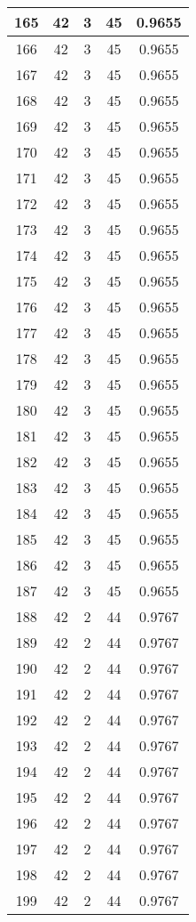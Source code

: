 \documentclass[letterpaper, 12pt]{article}
\begin{document}
\begin{longtable}{|c|c|c|c|c|}
\hline
165 & 42 & 3 & 45 & 0.9655 \\
\hline
166 & 42 & 3 & 45 & 0.9655 \\
\hline
167 & 42 & 3 & 45 & 0.9655 \\
\hline
168 & 42 & 3 & 45 & 0.9655 \\
\hline
169 & 42 & 3 & 45 & 0.9655 \\
\hline
170 & 42 & 3 & 45 & 0.9655 \\
\hline
171 & 42 & 3 & 45 & 0.9655 \\
\hline
172 & 42 & 3 & 45 & 0.9655 \\
\hline
173 & 42 & 3 & 45 & 0.9655 \\
\hline
174 & 42 & 3 & 45 & 0.9655 \\
\hline
175 & 42 & 3 & 45 & 0.9655 \\
\hline
176 & 42 & 3 & 45 & 0.9655 \\
\hline
177 & 42 & 3 & 45 & 0.9655 \\
\hline
178 & 42 & 3 & 45 & 0.9655 \\
\hline
179 & 42 & 3 & 45 & 0.9655 \\
\hline
180 & 42 & 3 & 45 & 0.9655 \\
\hline
181 & 42 & 3 & 45 & 0.9655 \\
\hline
182 & 42 & 3 & 45 & 0.9655 \\
\hline
183 & 42 & 3 & 45 & 0.9655 \\
\hline
184 & 42 & 3 & 45 & 0.9655 \\
\hline
185 & 42 & 3 & 45 & 0.9655 \\
\hline
186 & 42 & 3 & 45 & 0.9655 \\
\hline
187 & 42 & 3 & 45 & 0.9655 \\
\hline
188 & 42 & 2 & 44 & 0.9767 \\
\hline
189 & 42 & 2 & 44 & 0.9767 \\
\hline
190 & 42 & 2 & 44 & 0.9767 \\
\hline
191 & 42 & 2 & 44 & 0.9767 \\
\hline
192 & 42 & 2 & 44 & 0.9767 \\
\hline
193 & 42 & 2 & 44 & 0.9767 \\
\hline
194 & 42 & 2 & 44 & 0.9767 \\
\hline
195 & 42 & 2 & 44 & 0.9767 \\
\hline
196 & 42 & 2 & 44 & 0.9767 \\
\hline
197 & 42 & 2 & 44 & 0.9767 \\
\hline
198 & 42 & 2 & 44 & 0.9767 \\
\hline
199 & 42 & 2 & 44 & 0.9767 \\
\hline
\end{longtable}
\end{document}
